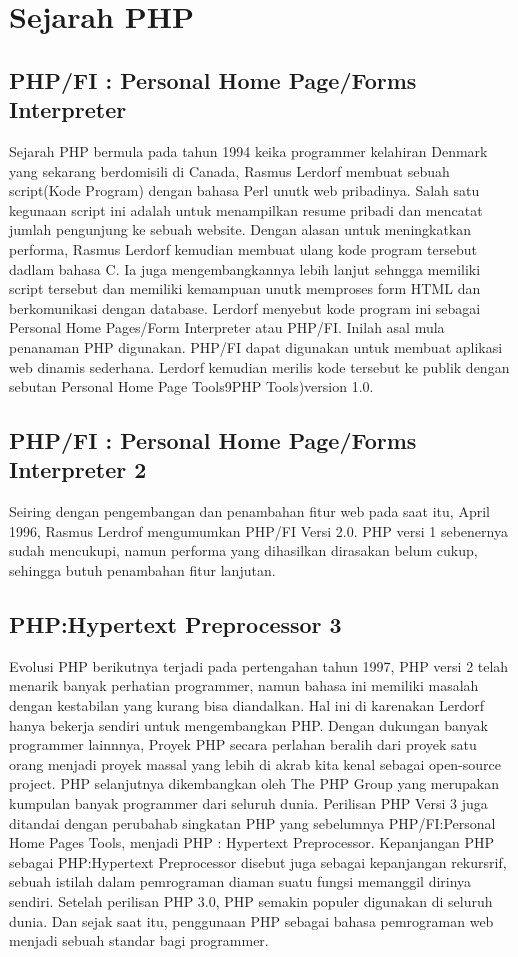 \section{Sejarah PHP}
\subsection{PHP/FI : Personal Home Page/Forms Interpreter}
Sejarah PHP bermula pada tahun 1994 keika programmer kelahiran Denmark yang sekarang berdomisili di Canada, Rasmus Lerdorf membuat sebuah script(Kode Program) dengan bahasa Perl unutk web pribadinya. Salah satu kegunaan script ini adalah untuk menampilkan resume pribadi dan mencatat jumlah pengunjung ke sebuah website.
\hfill \break
Dengan alasan untuk meningkatkan performa, Rasmus Lerdorf kemudian membuat ulang kode program tersebut dadlam bahasa C. Ia juga mengembangkannya lebih lanjut sehngga memiliki script tersebut dan memiliki kemampuan unutk memproses form HTML dan berkomunikasi dengan database.
\hfill \break
Lerdorf menyebut kode program ini sebagai Personal Home Pages/Form Interpreter atau PHP/FI. Inilah asal mula penanaman PHP digunakan. PHP/FI dapat digunakan untuk membuat aplikasi web dinamis sederhana.
\hfill \break
Lerdorf kemudian merilis kode tersebut ke publik dengan sebutan Personal Home Page Tools9PHP Tools)version 1.0. 
\subsection{PHP/FI : Personal Home Page/Forms Interpreter 2}
\hfill \break
Seiring dengan pengembangan dan penambahan fitur web pada saat itu, April 1996, Rasmus Lerdrof mengumumkan PHP/FI Versi 2.0. PHP versi 1 sebenernya sudah mencukupi, namun performa yang dihasilkan dirasakan belum cukup, sehingga butuh penambahan fitur lanjutan.
\subsection{PHP:Hypertext Preprocessor 3}
\hfill \break
Evolusi PHP berikutnya terjadi pada pertengahan tahun 1997, PHP versi 2 telah menarik banyak perhatian programmer, namun bahasa ini memiliki masalah dengan kestabilan yang kurang bisa diandalkan. Hal ini di karenakan Lerdorf hanya bekerja sendiri untuk mengembangkan PHP.
\hfill \break
Dengan dukungan banyak programmer lainnnya, Proyek PHP secara perlahan beralih dari proyek satu orang menjadi proyek massal yang lebih di akrab kita kenal sebagai open-source project. PHP selanjutnya dikembangkan oleh The PHP Group yang merupakan kumpulan banyak programmer dari seluruh dunia.
\hfill \break
Perilisan PHP Versi 3 juga ditandai dengan perubahab singkatan PHP yang sebelumnya PHP/FI:Personal Home Pages Tools, menjadi PHP : Hypertext Preprocessor. Kepanjangan PHP sebagai PHP:Hypertext Preprocessor disebut juga sebagai kepanjangan rekursrif, sebuah istilah dalam pemrograman diaman suatu fungsi memanggil dirinya sendiri.
\hfill \break
Setelah perilisan PHP 3.0, PHP semakin populer digunakan di seluruh dunia. Dan sejak saat itu, penggunaan PHP sebagai bahasa pemrograman web menjadi sebuah standar bagi programmer.
